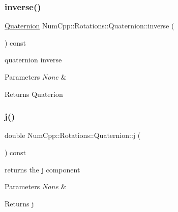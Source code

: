 \subsubsection{\texorpdfstring{inverse()}{inverse()}}
{\footnotesize\ttfamily \mbox{\hyperlink{class_num_cpp_1_1_rotations_1_1_quaternion}{Quaternion}} Num\+Cpp\+::\+Rotations\+::\+Quaternion\+::inverse (\begin{DoxyParamCaption}{ }\end{DoxyParamCaption}) const\hspace{0.3cm}{\ttfamily [inline]}}

quaternion inverse


\begin{DoxyParams}{Parameters}
{\em None} & \\
\hline
\end{DoxyParams}
\begin{DoxyReturn}{Returns}
Quaterion 
\end{DoxyReturn}
\mbox{\label{class_num_cpp_1_1_rotations_1_1_quaternion_ae4f3baf645a22886a64668c15076d508}} 
\subsubsection{\texorpdfstring{j()}{j()}}
{\footnotesize\ttfamily double Num\+Cpp\+::\+Rotations\+::\+Quaternion\+::j (\begin{DoxyParamCaption}{ }\end{DoxyParamCaption}) const\hspace{0.3cm}{\ttfamily [inline]}}

returns the j component


\begin{DoxyParams}{Parameters}
{\em None} & \\
\hline
\end{DoxyParams}
\begin{DoxyReturn}{Returns}
j 
\end{DoxyReturn}
\mbox{\label{class_num_cpp_1_1_rotations_1_1_quaternion_aa82d6223b80d45bca7ddf0986acc4e0a}} 
